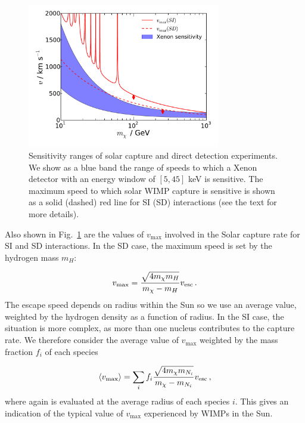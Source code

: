 \begin{figure}[t]
  \centering
  \includegraphics[trim=0.8cm 0.9cm 0cm 0cm, clip,width=0.75\textwidth]{NT/SpeedOverlap.pdf}
  \caption[Speed sensitivity ranges of solar capture and direct detection experiments as a function of WIMP mass]{Sensitivity ranges of solar capture and direct detection experiments. We show as a blue band the range of speeds to which a Xenon detector with an energy window of $[5,45]$ keV is sensitive. The maximum speed to which solar WIMP capture is sensitive is shown as a solid (dashed) red line for SI (SD) interactions (see the text for more details).}
  \label{fig:NT:speedoverlap}
\end{figure}

Also shown in Fig.~\ref{fig:NT:speedoverlap} are the values of $v_\textrm{max}$ involved in the Solar capture rate for SI and SD interactions. In the SD case, the maximum speed is set by the hydrogen mass $m_H$:

\begin{equation}
v_{\textrm{max}} = \frac{\sqrt{4m_\chi m_H}}{m_\chi - m_H}\vesc\,.
\end{equation}
The escape speed \vesc depends on radius within the Sun so we use an average value, weighted by the hydrogen density as a function of radius. In the SI case, the situation is more complex, as more than one nucleus contributes to the capture rate. We therefore consider the average value of $v_\textrm{max}$ weighted by the mass fraction $f_i$ of each species

\begin{equation}
\langle v_{\textrm{max}} \rangle = \sum_i f_i \frac{\sqrt{4m_\chi m_{N_i}}}{m_\chi - m_{N_i}}\vesc\,,
\end{equation}
where again \vesc is evaluated at the average radius of each species $i$. This gives an indication of the typical value of $v_\textrm{max}$ experienced by WIMPs in the Sun.

